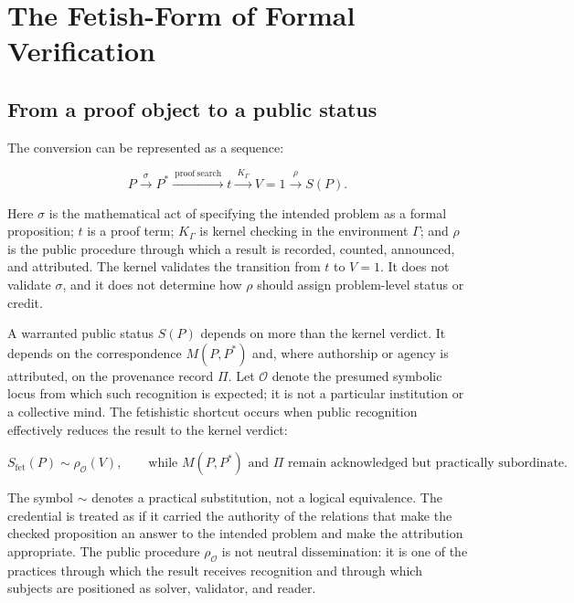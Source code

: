 \documentclass[pdflatex,sn-apa]{sn-jnl}
\begin{document}
\section{The Fetish-Form of Formal Verification}

\subsection{From a proof object to a public status}

The conversion can be represented as a sequence:

\[
P \xrightarrow{\ \sigma\ } P^*
\xrightarrow{\ \mathrm{proof\ search}\ } t
\xrightarrow{\ K_{\Gamma}\ } V=1
\xrightarrow{\ \rho\ } S(P).
\]

Here \(\sigma\) is the mathematical act of specifying the intended problem as a formal proposition; \(t\) is a proof term; \(K_{\Gamma}\) is kernel checking in the environment \(\Gamma\); and \(\rho\) is the public procedure through which a result is recorded, counted, announced, and attributed. The kernel validates the transition from \(t\) to \(V=1\). It does not validate \(\sigma\), and it does not determine how \(\rho\) should assign problem-level status or credit.

A warranted public status \(S(P)\) depends on more than the kernel verdict. It depends on the correspondence \(M(P,P^*)\) and, where authorship or agency is attributed, on the provenance record \(\Pi\). Let \(\mathcal{O}\) denote the presumed symbolic locus from which such recognition is expected; it is not a particular institution or a collective mind. The fetishistic shortcut occurs when public recognition effectively reduces the result to the kernel verdict:

\[
S_{\mathrm{fet}}(P)\sim \rho_{\mathcal{O}}(V),
\qquad
\text{while } M(P,P^*) \text{ and } \Pi
\text{ remain acknowledged but practically subordinate.}
\]

The symbol \(\sim\) denotes a practical substitution, not a logical equivalence. The credential is treated as if it carried the authority of the relations that make the checked proposition an answer to the intended problem and make the attribution appropriate. The public procedure \(\rho_{\mathcal{O}}\) is not neutral dissemination: it is one of the practices through which the result receives recognition and through which subjects are positioned as solver, validator, and reader.
\end{document}
